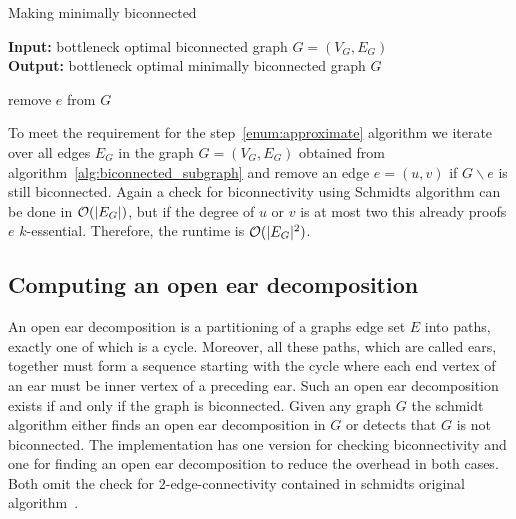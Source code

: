 \begin{algorithm}[ht!]
  \caption{Making minimally biconnected}\label{alg:minimally_biconnected}
  \textbf{Input: } bottleneck optimal biconnected graph \(G = (V_G, E_G)\)\\
  \textbf{Output: } bottleneck optimal minimally biconnected graph \(G\)
  \begin{algorithmic}[1]
          \State remove \(e\) from \(G\)
        \EndIf
      \EndFor
      \State {}
    \EndProcedure
  \end{algorithmic}
\end{algorithm}

To meet the requirement for the step~\ref{enum:approximate} algorithm we iterate over all edges \(E_G\) in the graph \(G = (V_G, E_G)\) obtained from algorithm~\ref{alg:biconnected_subgraph} and remove an edge \(e = (u, v)\) if \(G \backslash e\) is still biconnected. Again a check for biconnectivity using Schmidts algorithm can be done in \(\mathcal{O}(\vert E_G \vert)\), but if the degree of \(u\) or \(v\) is at most two this already proofs \(e\) \(k\)-essential. Therefore, the runtime is \(\mathcal{O}(\vert {E_G} \vert^2)\).

\subsection{Computing an open ear decomposition}\label{subsec:open_ear_decomposition}

An open ear decomposition is a partitioning of a graphs edge set \(E\) into paths, exactly one of which is a cycle. Moreover, all these paths, which are called ears, together must form a sequence starting with the cycle where each end vertex of an ear must be inner vertex of a preceding ear.
Such an open ear decomposition exists if and only if the graph is biconnected.
Given any graph \(G\) the schmidt algorithm either finds an open ear decomposition in \(G\) or detects that \(G\) is not biconnected. The implementation has one version for checking biconnectivity and one for finding an open ear decomposition to reduce the overhead in both cases. Both omit the check for \(2\)-edge-connectivity contained in schmidts original algorithm~\cite{schmidt2013}.

